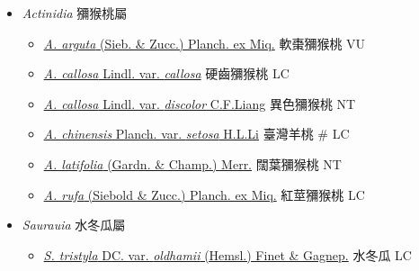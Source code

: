 
  \begin{itemize}
 \item[] \textit{Actinidia} 獼猴桃屬
                                
  \begin{itemize}
        \item[] \href{http://www.theplantlist.org/tpl1.1/search?q=Actinidia+arguta}{\textit{A. arguta} (Sieb. \& Zucc.) Planch. ex Miq.}   軟棗獼猴桃   VU
        \item[] \href{http://www.theplantlist.org/tpl1.1/search?q=Actinidia+callosa+var.+callosa}{\textit{A. callosa} Lindl. var. \textit{callosa}}   硬齒獼猴桃   LC
        \item[] \href{http://www.theplantlist.org/tpl1.1/search?q=Actinidia+callosa+var.+discolor}{\textit{A. callosa} Lindl. var. \textit{discolor} C.F.Liang}   異色獼猴桃   NT
        \item[] \href{http://www.theplantlist.org/tpl1.1/search?q=Actinidia+chinensis+var.+setosa}{\textit{A. chinensis} Planch. var. \textit{setosa} H.L.Li}   臺灣羊桃  \# LC
        \item[] \href{http://www.theplantlist.org/tpl1.1/search?q=Actinidia+latifolia}{\textit{A. latifolia} (Gardn. \& Champ.) Merr.}   闊葉獼猴桃   NT
        \item[] \href{http://www.theplantlist.org/tpl1.1/search?q=Actinidia+rufa}{\textit{A. rufa} (Siebold \& Zucc.) Planch. ex Miq.}   紅莖獼猴桃   LC
  \end{itemize}
 \item[] \textit{Saurauia} 水冬瓜屬
                                
  \begin{itemize}
        \item[] \href{http://www.theplantlist.org/tpl1.1/search?q=Saurauia+tristyla+var.+oldhamii}{\textit{S. tristyla} DC. var. \textit{oldhamii} (Hemsl.) Finet \& Gagnep.}   水冬瓜   LC
  \end{itemize}
  \end{itemize}
